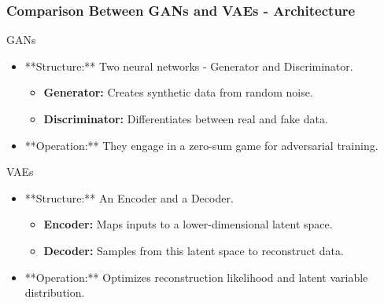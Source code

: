 \documentclass[aspectratio=169]{beamer}
\begin{document}
\begin{frame}[fragile]
    \frametitle{Comparison Between GANs and VAEs - Architecture}
    \begin{block}{GANs}
        \begin{itemize}
            \item **Structure:** Two neural networks - Generator and Discriminator.
            \begin{itemize}
                \item \textbf{Generator:} Creates synthetic data from random noise.
                \item \textbf{Discriminator:} Differentiates between real and fake data.
            \end{itemize}
            \item **Operation:** They engage in a zero-sum game for adversarial training.
        \end{itemize}
    \end{block}
    
    \begin{block}{VAEs}
        \begin{itemize}
            \item **Structure:** An Encoder and a Decoder.
            \begin{itemize}
                \item \textbf{Encoder:} Maps inputs to a lower-dimensional latent space.
                \item \textbf{Decoder:} Samples from this latent space to reconstruct data.
            \end{itemize}
            \item **Operation:** Optimizes reconstruction likelihood and latent variable distribution.
        \end{itemize}
    \end{block}
\end{frame}
\end{document}
